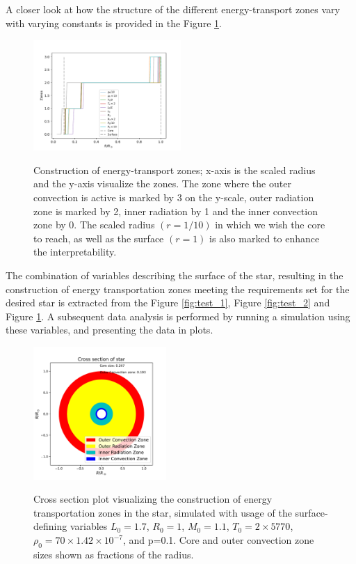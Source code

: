 \documentclass[10pt, nofootinbib, twocolumn]{revtex4-1}
\begin{document}
A closer look at how the structure of the different energy-transport zones vary with varying constants is provided in the Figure \ref{fig:test_construction}. 

\begin{figure}[H]
    \caption{Construction of energy-transport zones; x-axis is the scaled radius and the y-axis visualize the zones. The zone where the outer convection is active is marked by 3 on the y-scale, outer radiation zone is marked by 2, inner radiation by 1 and the inner convection zone by 0. The scaled radius $(r=1/10)$ in which we wish the core to reach, as well as the surface $(r=1)$ is also marked to enhance the interpretability.}
    \centering
    \includegraphics[width = 0.5\textwidth]{Figures/construction.pdf} 
    \label{fig:test_construction}
\end{figure} 

The combination of variables describing the surface of the star, resulting in the construction of energy transportation zones meeting the requirements set for the desired star is extracted from the Figure \ref{fig:test_1}, Figure \ref{fig:test_2} and Figure \ref{fig:test_construction}. A subsequent data analysis is performed by running a simulation using these variables, and presenting the data in plots.

\begin{figure}[H]
    \caption{Cross section plot visualizing the construction of energy transportation zones in the star, simulated with usage of the surface-defining variables  $L_0=1.7$, $R_0=1$, $M_0=1.1$, $T_0=2\times5770$, $\rho_0=70\times1.42\times 10^{-7}$, and p=0.1.  Core and outer convection zone sizes shown as fractions of the radius.}
    \centering
    \includegraphics[width = 0.45\textwidth]{Figures/final_crossfinal.pdf} 
    \label{fig:cross}
\end{figure} 
\end{document}
